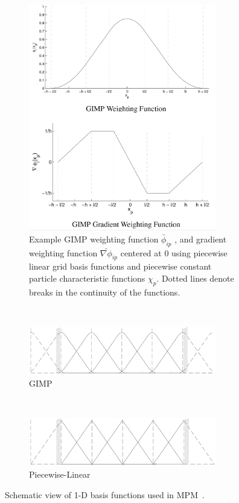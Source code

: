 \begin{figure}[tbhp]
	\centering
	\begin{subfigure}[b]{0.7\textwidth}
	\centering
	\includegraphics[width=0.9\textwidth]{gimp}
	\caption{Example GIMP weighting function $\bar{\phi}_{ip}$ ,
	and gradient weighting function $\bar{\nabla\phi}_{ip}$ centered at 0 using 
	piecewise linear grid basis functions and piecewise constant particle 
	characteristic functions $\chi_p$. Dotted lines denote breaks in the 
	continuity
	of the functions.}
	\label{fig:gimp}
	\end{subfigure}\\
	\begin{subfigure}[b]{0.9\textwidth}
		\centering
		\includegraphics[width=0.9\textwidth]{GIMP_function}
		\caption{GIMP}
		\label{fig:GIMP_function}
	\end{subfigure}\\
	\begin{subfigure}[b]{0.9\textwidth}
		\centering
		\includegraphics[width=0.9\textwidth]{MPM_Linear}
		\caption{Piecewise-Linear}
		\label{fig:MPM_Linear}
	\end{subfigure} 
	\caption{Schematic view of 1-D basis functions used in 
	MPM~\citep{Steffen2008}.}
	\label{fig:MPM_GIMP_func}
\end{figure}

